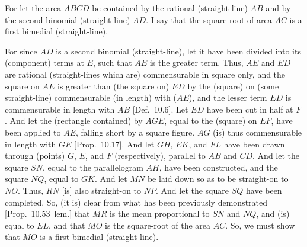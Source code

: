 \epsfysize=1.3in
\centerline{}

For let the area $ABCD$ be contained by the rational (straight-line) $AB$
and by the second binomial (straight-line)  $AD$. I say that the square-root
of  area $AC$ is a first bimedial (straight-line).\

For since $AD$ is a second binomial (straight-line), let it have been divided
into its (component) terms at $E$, such that $AE$ is the greater term. Thus,
$AE$ and $ED$ are rational (straight-lines which are) commensurable
in square only, and the square on $AE$ is greater than (the square on)
$ED$ by the (square) on (some straight-line) commensurable (in length) with ($AE$),
and the lesser term $ED$ is commensurable in length with $AB$ [Def.~10.6].  Let $ED$ have been cut in half at $F$.
And let the (rectangle contained) by $AGE$, equal to the (square) on $EF$,
 have been applied to $AE$, falling short by a square figure. $AG$
(is) thus commensurable in length with $GE$ [Prop.~10.17]. And let $GH$, $EK$, and
$FL$ have been drawn through (points) $G$, $E$, and $F$ (respectively), parallel
to $AB$ and $CD$. And let the square $SN$, equal to the parallelogram
$AH$, have been constructed, and the square $NQ$, equal to
$GK$.  And let $MN$ be laid down so as to be straight-on to $NO$. Thus,
$RN$ [is] also straight-on to $NP$. And let the square $SQ$ have been
completed. So, (it is) clear from what has been previously
demonstrated [Prop.~10.53~lem.] that
$MR$ is the mean proportional to $SN$ and $NQ$, and (is) equal to
$EL$, and that $MO$ is the square-root of the area $AC$. So, we
must show that $MO$ is a first bimedial (straight-line).

